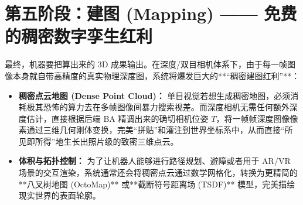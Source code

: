 \documentclass[12pt,a4paper]{article}
\begin{document}
\section{第五阶段：建图 (Mapping) —— 免费的稠密数字孪生红利}
最终，机器要把算出来的 3D 成果输出。在深度/双目相机体系下，由于每一帧图像本身就自带高精度的真实物理深度图，系统将爆发巨大的**“稠密建图红利”**：
\begin{itemize}
    \item \textbf{稠密点云地图 (Dense Point Cloud)：} 单目视觉若想生成稠密地图，必须消耗极其恐怖的算力去在多帧图像间暴力搜索视差。而深度相机无需任何额外深度估计，直接根据后端 BA 精调出来的确切相机位姿 $T$，将一帧帧深度图像像素通过三维几何刚体变换，完美“拼贴”和灌注到世界坐标系中，从而直接“所见即所得”地生长出照片级的致密三维点云。
    \item \textbf{体积与拓扑控制：} 为了让机器人能够进行路径规划、避障或者用于 AR/VR 场景的交互渲染，系统通常还会将稠密点云通过数学网格化，转换为更精简的**八叉树地图 (OctoMap)** 或**截断符号距离场 (TSDF)** 模型，完美描绘现实世界的表面轮廓。
\end{itemize}
\end{document}
